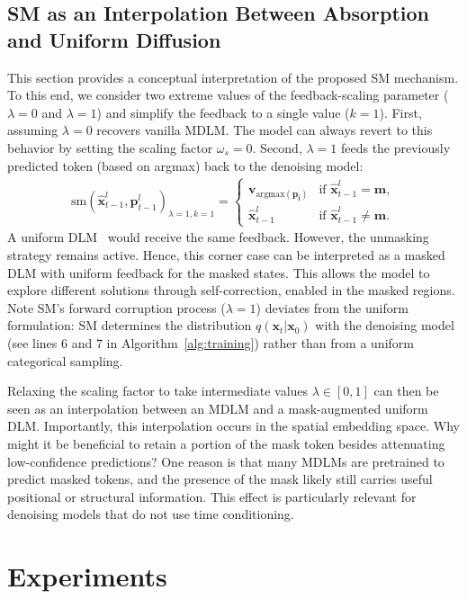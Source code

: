\documentclass{article}
\begin{document}
\subsection{SM as an Interpolation Between Absorption and Uniform Diffusion}
This section provides a conceptual interpretation of the proposed SM mechanism. 
% 
To this end, we consider two extreme values of the feedback-scaling parameter ($\lambda=0$ and $\lambda=1$) and simplify the feedback to a single value ($k=1$). 
%
First, assuming $\lambda=0$ recovers vanilla MDLM. 
% 
The model can always revert to this behavior by setting the scaling factor $\omega_s = 0$.
% 
Second, $\lambda=1$ feeds the previously predicted token (based on argmax) back to the denoising model: 
\begin{align*}
    \text{sm}(\mathbf{\hat{x}}^l_{t-1}, \mathbf{p}^l_{t-1})_{\lambda=1, k=1} =\begin{cases} \mathbf{v}_{\text{argmax}(\mathbf{p_i})} & \text{if } \mathbf{\hat{x}}^l_{t-1} = \mathbf{m}, \\
\mathbf{\hat{x}}^l_{t-1} & \text{if } \mathbf{\hat{x}}^l_{t-1} \neq \mathbf{m}. 
\end{cases}
\end{align*}
A uniform DLM~\citep{austin_structured_2021} would receive the same feedback. However, the unmasking strategy remains active. 
%
Hence, this corner case can be interpreted as a masked DLM with uniform feedback for the masked states. 
%
This allows the model to explore different solutions through self-correction, enabled in the masked regions.
% 
Note SM's forward corruption process ($\lambda=1$) deviates from the uniform formulation: SM determines the distribution $q(\mathbf{x}_t|\mathbf{x}_0)$ with the denoising model (see lines 6 and 7 in Algorithm~\ref{alg:training}) rather than from a uniform categorical sampling. 

Relaxing the scaling factor to take intermediate values $\lambda\in[0,1]$ can then be seen as an interpolation between an MDLM and a mask-augmented uniform DLM. 
% 
Importantly, this interpolation occurs in the spatial embedding space.
%
Why might it be beneficial to retain a portion of the mask token besides attenuating low-confidence predictions?
%
One reason is that many MDLMs are pretrained to predict masked tokens, and the presence of the mask likely still carries useful positional or structural information. 
%
This effect is particularly relevant for denoising models that do not use time conditioning.

\section{Experiments}\label{sec:experiments}
\end{document}
